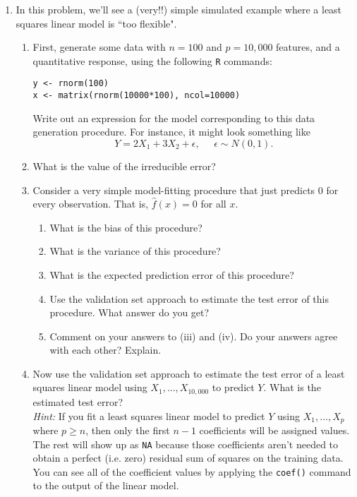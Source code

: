 \documentclass[12pt]{article}
\begin{document}
\begin{enumerate}
\item   In this problem, we'll see a (very!!) simple simulated example where a least squares linear model is ``too flexible". 

\begin{enumerate}

\item First, generate some data with $n=100$ and $p=10,000$ features, and a quantitative response, using the following \verb=R= commands:

\begin{verbatim}
y <- rnorm(100)
x <- matrix(rnorm(10000*100), ncol=10000)
\end{verbatim}



Write out an expression for the model corresponding to this data generation procedure.  For instance, it might look something like 
$$Y = 2 X_1 + 3 X_2 + \epsilon, \;\;\;\;\; \epsilon \sim N(0,1).$$

\item What is the value of the irreducible error?

\item Consider a very simple model-fitting procedure that just predicts $0$ for every observation. That is, $\hat{f}(x)=0$ for all $x$.
\begin{enumerate}
\item What is the bias of this procedure?
\item What is the variance of this procedure?
\item What is the expected prediction error of this procedure?
\item Use the validation set approach to estimate the test error of this procedure. What answer do you get?
\item Comment on your answers to (iii) and (iv). Do your answers agree with each other? Explain. 
\end{enumerate}

 
\item Now use the validation set approach to estimate the test error  
of a least squares linear model using $X_1,\ldots,X_{10,000}$ to predict $Y$.  What is the estimated test error? \\

\noindent \emph{Hint:} If you fit a least squares linear model to predict $Y$ using $X_1,\ldots,X_p$ where $p \geq n$, then only  the first $n-1$ coefficients will be assigned values. The rest will show up as \verb=NA= because those coefficients aren't needed to obtain a perfect (i.e. zero) residual sum of squares on the training data. You can see all of the coefficient values by applying the \verb=coef()= command to the output of the linear model. 


\end{enumerate}
\end{enumerate}
\end{document}
